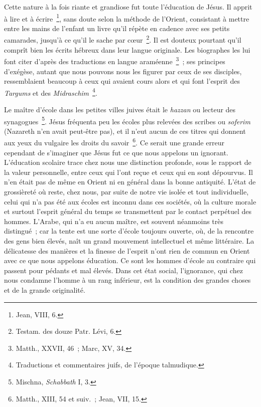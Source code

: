 \documentclass[french,twoside]{book} %
\newcommand\chaptercont{} %
\begin{document}
\chaptercont
\noindent Cette nature à la fois riante et grandiose fut toute l’éducation de Jésus. Il apprit à lire et à écrire \footnote{Jean, VIII, 6.}, sans doute selon la méthode de l’Orient, consistant à mettre entre les mains de l’enfant un livre qu’il répète en cadence avec ses petits camarades, jusqu’à ce qu’il le sache par cœur \footnote{Testam. des douze Patr. Lévi, 6.}. Il est douteux pourtant qu’il comprît bien les écrits hébreux dans leur langue originale. Les biographes les lui font citer d’après des traductions en langue araméenne \footnote{Matth., XXVII, 46 ; Marc, XV, 34.} ; ses principes d’exégèse, autant que nous pouvons nous les figurer par ceux de ses disciples, ressemblaient beaucoup à ceux qui avaient cours alors et qui font l’esprit des {\itshape Targums} et des {\itshape Midraschim} \footnote{Traductions et commentaires juifs, de l’époque talmudique.}.\par
Le maître d’école dans les petites villes juives était le {\itshape hazzan} ou lecteur des synagogues \footnote{ Mischna, {\itshape Schabbath} I, 3.}. Jésus fréquenta peu les écoles plus relevées des scribes ou {\itshape soferim} (Nazareth n’en avait peut-être pas), et il n’eut aucun de ces titres qui donnent aux yeux du vulgaire les droits du savoir \footnote{Matth., XIII, 54 et suiv. ; Jean, VII, 15.}. Ce serait une grande erreur cependant de s’imaginer que Jésus fut ce que nous appelons un ignorant. L’éducation scolaire trace chez nous une distinction profonde, sous le rapport de la valeur personnelle, entre ceux qui l’ont reçue et ceux qui en sont dépourvus. Il n’en était pas de même en Orient ni en général dans la bonne antiquité. L’état de grossièreté où reste, chez nous, par suite de notre vie isolée et tout individuelle, celui qui n’a pas été aux écoles est inconnu dans ces sociétés, où la culture morale et surtout l’esprit général du temps se transmettent par le contact perpétuel des hommes. L’Arabe, qui n’a eu aucun maître, est souvent néanmoins très distingué ; car la tente est une sorte d’école toujours ouverte, où, de la rencontre des gens bien élevés, naît un grand mouvement intellectuel et même littéraire. La délicatesse des manières et la finesse de l’esprit n’ont rien de commun en Orient avec ce que nous appelons éducation. Ce sont les hommes d’école au contraire qui passent pour pédants et mal élevés. Dans cet état social, l’ignorance, qui chez nous condamne l’homme à un rang inférieur, est la condition des grandes choses et de la grande originalité.\par
\end{document}

